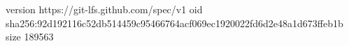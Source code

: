 version https://git-lfs.github.com/spec/v1
oid sha256:92d192116c52db514459c95466764acf069ec1920022fd6d2e48a1d673ffeb1b
size 189563
